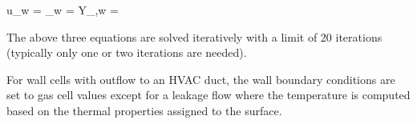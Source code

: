 \be u_w =  \ee
\be \rho_w =  \ee
\be Y_{\alpha,w} =  \ee

The above three equations are solved iteratively with a limit of 20 iterations (typically only one or two iterations are needed).

For wall cells with outflow to an HVAC duct, the wall boundary conditions are set to gas cell values except for a leakage flow where the temperature is computed based on the thermal properties assigned to the surface.
